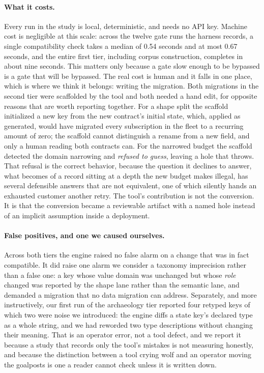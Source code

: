 \documentclass[11pt]{article}
\begin{document}
\paragraph{What it costs.} Every run in the study is local, deterministic, and
needs no API key. Machine cost is negligible at this scale: across the twelve
gate runs the harness records, a single compatibility check takes a median of
0.54 seconds and at most 0.67 seconds, and the entire first tier, including
corpus construction, completes in about nine seconds. This matters only because
a gate slow enough to be bypassed is a gate that will be bypassed. The real cost is
human and it falls in one place, which is where we think it belongs: writing the
migration. Both migrations in the second tier were scaffolded by the tool and
both needed a hand edit, for opposite reasons that are worth reporting together.
For a shape split the scaffold initialized a new key from the new contract's
initial state, which, applied as generated, would have migrated every
subscription in the fleet to a recurring amount of zero; the scaffold cannot
distinguish a rename from a new field, and only a human reading both contracts
can. For the narrowed budget the scaffold detected the domain narrowing and
\emph{refused to guess}, leaving a hole that throws. That refusal is the correct
behavior, because the question it declines to answer, what becomes of a record
sitting at a depth the new budget makes illegal, has several defensible answers
that are not equivalent, one of which silently hands an exhausted customer
another retry. The tool's contribution is not the conversion. It is that the
conversion became a reviewable artifact with a named hole instead of an implicit
assumption inside a deployment.

\paragraph{False positives, and one we caused ourselves.} Across both tiers the
engine raised no false alarm on a change that was in fact compatible. It did
raise one alarm we consider a taxonomy imprecision rather than a false one: a key
whose value domain was unchanged but whose \emph{role} changed was reported by
the shape lane rather than the semantic lane, and demanded a migration that no
data migration can address. Separately, and more instructively, our first run of
the archaeology tier reported four retyped keys of which two were noise we
introduced: the engine diffs a state key's declared type as a whole string, and
we had reworded two type descriptions without changing their meaning. That is an
operator error, not a tool defect, and we report it because a study that records
only the tool's mistakes is not measuring honestly, and because the distinction
between a tool crying wolf and an operator moving the goalposts is one a reader
cannot check unless it is written down.
\end{document}
